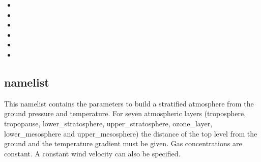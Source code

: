 \begin{itemize}
\item
{}

\item
{}

\item
{}

\item
{}

\item
{}

\item
{}
\end{itemize}

\subsection{ namelist}
This namelist contains the parameters to build a stratified atmosphere from
the ground pressure and temperature. For seven atmospheric layers (troposphere,
tropopause, lower\_stratosphere, upper\_stratosphere, ozone\_layer, lower\_mesosphere and upper\_mesosphere) the distance of the top level from the ground and the temperature gradient must be given. Gas concentrations are constant. A constant wind velocity can also be specified.


